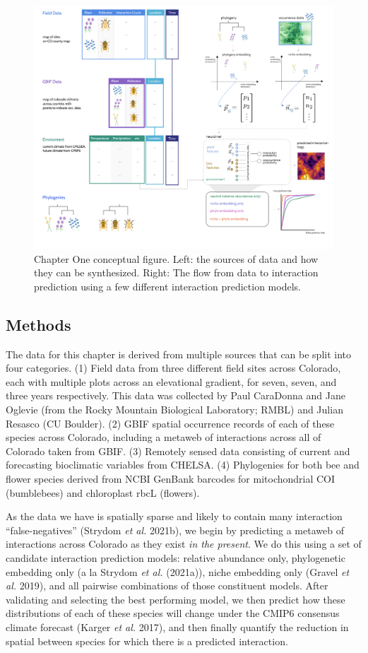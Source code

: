 \documentclass[10pt,oneside]{article}
\makeatletter
\def\maxwidth{\ifdim\Gin@nat@width>\linewidth\linewidth
\else\Gin@nat@width\fi}
\let\Oldincludegraphics\includegraphics
\renewcommand{\includegraphics}[1]{\Oldincludegraphics[width=\maxwidth]{#1}}
\makeatother
\begin{document}
\begin{figure}
\centering
\includegraphics{./figures/ch1.png}
\caption{Chapter One conceptual figure. Left: the sources of data and
how they can be synthesized. Right: The flow from data to interaction
prediction using a few different interaction prediction models.}
\end{figure}

\hypertarget{methods-1}{%
\subsection{Methods}\label{methods-1}}

The data for this chapter is derived from multiple sources that can be
split into four categories. (1) Field data from three different field
sites across Colorado, each with multiple plots across an elevational
gradient, for seven, seven, and three years respectively. This data was
collected by Paul CaraDonna and Jane Oglevie (from the Rocky Mountain
Biological Laboratory; RMBL) and Julian Resasco (CU Boulder). (2) GBIF
spatial occurrence records of each of these species across Colorado,
including a metaweb of interactions across all of Colorado taken from
GBIF. (3) Remotely sensed data consisting of current and forecasting
bioclimatic variables from CHELSA. (4) Phylogenies for both bee and
flower species derived from NCBI GenBank barcodes for mitochondrial COI
(bumblebees) and chloroplast rbcL (flowers).

As the data we have is spatially sparse and likely to contain many
interaction ``false-negatives'' (Strydom \emph{et al.} 2021b), we begin
by predicting a metaweb of interactions across Colorado as they exist
\emph{in the present}. We do this using a set of candidate interaction
prediction models: relative abundance only, phylogenetic embedding only
(a la Strydom \emph{et al.} (2021a)), niche embedding only (Gravel
\emph{et al.} 2019), and all pairwise combinations of those constituent
models. After validating and selecting the best performing model, we
then predict how these distributions of each of these species will
change under the CMIP6 consensus climate forecast (Karger \emph{et al.}
2017), and then finally quantify the reduction in spatial between
species for which there is a predicted interaction.
\end{document}
